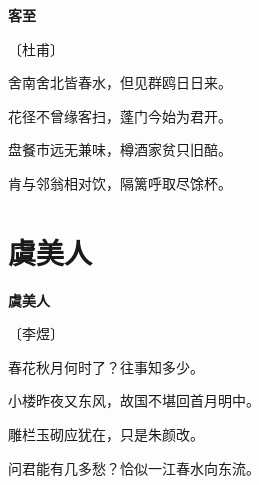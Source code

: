 \documentclass[12pt,UTF-8,openany,fontset=none]{ctexbook}
\begin{document}

\begin{center}
    {\bfseries 客至}

    \vspace{18pt}

    \begin{large}\xuwen
        〔杜甫〕
    \end{large}

\end{center}

    \vspace{18pt}  %

\begin{center}
    \begin{Large}

        舍南舍北皆春水，但见群鸥日日来。

        花径不曾缘客扫，蓬门今始为君开。

        盘餐市远无兼味，樽酒家贫只旧醅。

        肯与邻翁相对饮，隔篱呼取尽馀杯。

    \end{Large}

\end{center}

\vspace{8pt}
\clearpage

\section{虞美人}


\begin{center}
    {\bfseries 虞美人}

    \vspace{18pt}

    \begin{large}\xuwen
        〔李煜〕
    \end{large}

\end{center}

    \vspace{18pt}  %

\begin{center}
    \begin{Large}

        春花秋月何时了？往事知多少。\hspace{58pt}

        小楼昨夜又东风，故国不堪回首月明中。

        \vspace{18pt}  %

        雕栏玉砌应犹在，只是朱颜改。\hspace{58pt}

        问君能有几多愁？恰似一江春水向东流。

    \end{Large}

\end{center}
\end{document}
